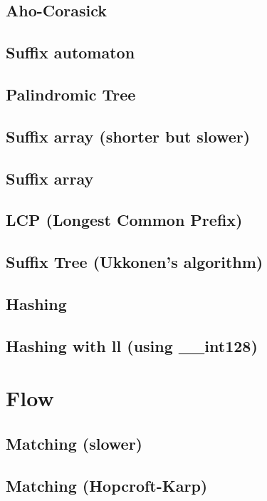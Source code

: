 \subsection{Aho-Corasick}
\subsection{Suffix automaton}
\subsection{Palindromic Tree}
\subsection{Suffix array (shorter but slower)}
\subsection{Suffix array}
\subsection{LCP (Longest Common Prefix)}
\subsection{Suffix Tree (Ukkonen's algorithm)}
\subsection{Hashing}
\subsection{Hashing with ll (using \_\_int128)}

\section{Flow}
\subsection{Matching (slower)}
\subsection{Matching (Hopcroft-Karp)}
